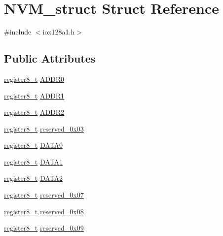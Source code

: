 \hypertarget{struct_n_v_m__struct}{
\section{NVM\_\-struct Struct Reference}
\label{struct_n_v_m__struct}
}


{\ttfamily \#include $<$iox128a1.h$>$}

\subsection*{Public Attributes}
\begin{DoxyCompactItemize}
\item 
\hyperlink{iox128a1_8h_a6a0649252b392263406882923b04a9db}{register8\_\-t} \hyperlink{struct_n_v_m__struct_ad8b53ef342d117b9e85a670e06219597}{ADDR0}
\item 
\hyperlink{iox128a1_8h_a6a0649252b392263406882923b04a9db}{register8\_\-t} \hyperlink{struct_n_v_m__struct_ad4421f9c21f662620a89d14b2a3a98fb}{ADDR1}
\item 
\hyperlink{iox128a1_8h_a6a0649252b392263406882923b04a9db}{register8\_\-t} \hyperlink{struct_n_v_m__struct_a7ad724fd0577fed763a8885746551836}{ADDR2}
\item 
\hyperlink{iox128a1_8h_a6a0649252b392263406882923b04a9db}{register8\_\-t} \hyperlink{struct_n_v_m__struct_a377563572a5ecc2cadeadff923266780}{reserved\_\-0x03}
\item 
\hyperlink{iox128a1_8h_a6a0649252b392263406882923b04a9db}{register8\_\-t} \hyperlink{struct_n_v_m__struct_aae250675c0d09bce387fe429af972fb1}{DATA0}
\item 
\hyperlink{iox128a1_8h_a6a0649252b392263406882923b04a9db}{register8\_\-t} \hyperlink{struct_n_v_m__struct_a16ab5a6b5525f905152f2233e6f49f41}{DATA1}
\item 
\hyperlink{iox128a1_8h_a6a0649252b392263406882923b04a9db}{register8\_\-t} \hyperlink{struct_n_v_m__struct_a8a857a9fcf7161c78e4bd193c68064c4}{DATA2}
\item 
\hyperlink{iox128a1_8h_a6a0649252b392263406882923b04a9db}{register8\_\-t} \hyperlink{struct_n_v_m__struct_a9398cc7991c7f91625d9312f0455f44b}{reserved\_\-0x07}
\item 
\hyperlink{iox128a1_8h_a6a0649252b392263406882923b04a9db}{register8\_\-t} \hyperlink{struct_n_v_m__struct_a75d52df81d63f3524c2fc98a97910a5e}{reserved\_\-0x08}
\item 
\hyperlink{iox128a1_8h_a6a0649252b392263406882923b04a9db}{register8\_\-t} \hyperlink{struct_n_v_m__struct_a67bb32a44e1c0ff03da943c418fe06da}{reserved\_\-0x09}

\end{DoxyCompactItemize}
